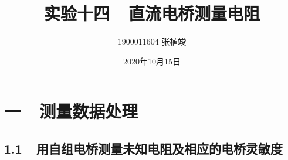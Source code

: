 \documentclass[a4paper]{ctexbook}
\begin{document}
\large

    \title{\textbf{实验十四\ \ 直流电桥测量电阻}}
    \author{\Large 1900011604 张植竣}
    \date{\Large 2020年10月15日}

    \maketitle


    \section*{ 一\ \ 测量数据处理}
    \bigskip

    \subsection*{ 1.1\ \ 用自组电桥测量未知电阻及相应的电桥灵敏度}
\end{document}
